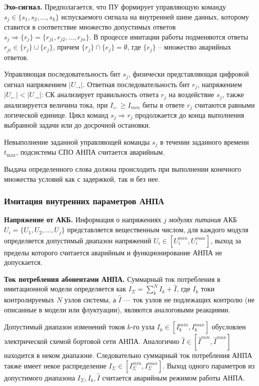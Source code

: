 \textbf{Эхо-сигнал.}
Предполагается, что ПУ формирует управляющую команду $s_j \in \{s_1, s_2, \ldots, s_k\}$ испускаемого сигнала на внутренней шине данных,
которому ставится в соответствие множество допустимых ответов $s_j \Rightarrow \{r_j\} = \{r_{j1}, r_{j2}, \ldots, r_{jn}\}$.
В процессе имитации работы подменяются ответы
$r_{ji} \in \{r_j\} \cup \{e_j\}$, причем $\{r_j\} \cap \{e_j\} = \emptyset$,
где $\{e_j\}$ -- множество аварийных ответов.


Управляющая последовательность бит $s_j$, физически представляющая цифровой сигнал напряжением $|U_{\longrightarrow}|$.
Ответная последовательность бит $r_j$, напряжением $|U_{\longleftarrow}| < |U_{\longrightarrow}|$:
СК анализирует правильность ответа $r_j$ на воздействие $s_j$,
также анализируется величина тока, при $I_{\longleftarrow} \geq I_{min}$ биты в ответе $r_j$ считаются равными логической единице.
Цикл команд $s_j \Rightarrow r_j$ продолжается до конца выполнения выбранной задачи или до досрочной остановки.

Невыполнение заданной управляющей команды $s_j$ в течении заданного времени $t_{\mbox{max}}$,
подсистемы СПО АНПА считается аварийным.

Выдача определенного слова должна происходить при выполнении конечного множества условий как с задержкой, так и без нее.


\subsubsection{Имитация внутренних параметров АНПА}\label{sec:model_anpa:inner_params}
\textbf{Напряжение от АКБ.}
Информация о напряжениях $j$ \textit{модулях питания} АКБ $U_i = \{U_1, U_2, \ldots, U_j\}$ представляется вещественным числом,
для каждого модуля определяется допустимый диапазон напряжений $U_i \in [U_i^{min}, U_i^{max}]$,
выход за пределы которого считается аварийным и функционирование АНПА не допускается.

\textbf{Ток потребления абонентами АНПА.}
Суммарный ток потребления в имитационной модели определяется как $I_\Sigma = \sum_k^N I_k + \hat I$,
где $I_k$ токи контролируемых $N$ узлов системы, а $\hat I$ --- ток узлов не подлежащих контролю (не описанные в модели или флуктуации),
являются аналоговыми реакциями. %

Допустимый диапазон изменений токов $k$-го узла $I_k \in [I_k^{min}, I_k^{max}]$ обусловлен электрической схемой бортовой сети АНПА.
Аналогично $\hat I \in [\hat I^{min}, \hat I^{max}]$ находится в неком диапазоне.
Следовательно суммарный ток потребления АНПА также имеет некое распределение $I_\Sigma \in [I_\Sigma^{min}, I_\Sigma^{max}]$.
Выход одного параметров из допустимого диапазона $I_\Sigma, I_k, \hat I$ считается аварийным режимом работы АНПА.

